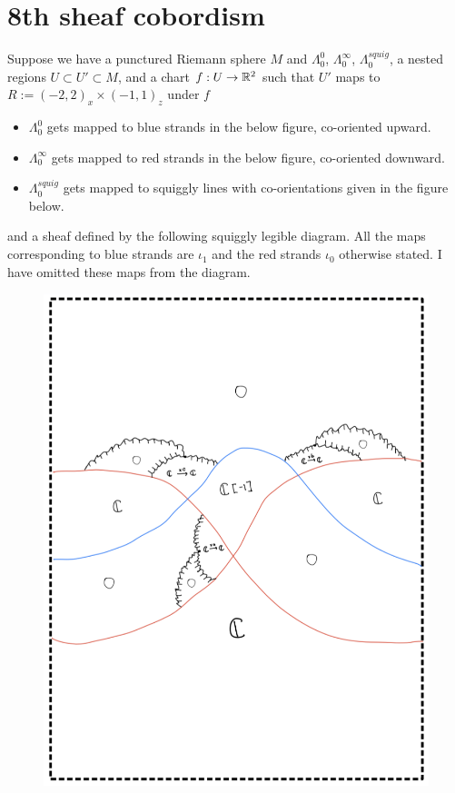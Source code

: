 \section{8th sheaf cobordism}
Suppose we have a punctured Riemann sphere $M$ and $\Lambda_0^0$, $\Lambda_0^\infty$, $\Lambda_0^{squig}$, a nested regions $U\subset U' \subset M$, and a chart $f : U \rightarrow \mathbb{R}^2$ such that $U'$ maps to $R:=(-2,2)_x \times (-1,1)_z$ under $f$
\begin{itemize}
\item $\Lambda_0^0$ gets mapped to blue strands in the below figure, co-oriented upward.

\item $\Lambda_0^\infty$ gets mapped to red strands in the below figure, co-oriented downward.

\item $\Lambda_0^{squig}$ gets mapped to squiggly lines with co-orientations given in the figure below.
\end{itemize}
and a sheaf defined by the following squiggly legible diagram. All the maps corresponding to blue strands are $\iota_1$ and the red strands $\iota_0$ otherwise stated. I have omitted these maps from the diagram.\\

\begin{figure}[H]
    \centering
    \includegraphics[scale = 0.85]{diagrams/cobord8/1.png}
    \caption{}
    \label{fig:your-label}
\end{figure}

